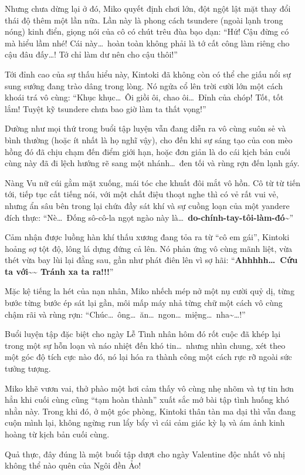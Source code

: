 \documentclass[../main.tex]{subfiles}
\begin{document}
\il

Nhưng chưa dừng lại ở đó, Miko quyết định chơi lớn, đột ngột lật mặt thay đổi thái độ thêm một lần nữa. Lần này là phong cách tsundere (ngoài lạnh trong nóng) kinh điển, giọng nói của cô có chút trêu đùa bạo dạn: ``Hứ! Cậu đừng có mà hiểu lầm nhé! Cái này\dots\ hoàn toàn không phải là tớ cất công làm riêng cho cậu đâu đấy\dots! Tớ chỉ làm dư nên cho cậu thôi!''

Tới đỉnh cao của sự thấu hiểu này, Kintoki đã không còn có thể che giấu nổi sự sung sướng đang trào dâng trong lòng. Nó ngửa cổ lên trời cười lớn một cách khoái trá vô cùng: ``Khục khục\dots\ Ôi giồi ôi, chao ôi\dots\ Đỉnh của chóp! Tốt, tốt lắm! Tuyệt kỹ tsundere chưa bao giờ làm ta thất vọng!''

\il

Dường như mọi thứ trong buổi tập luyện vẫn đang diễn ra vô cùng suôn sẻ và bình thường (hoặc ít nhất là họ nghĩ vậy), cho đến khi sự sáng tạo của con mèo hồng đó đã chịu chạm đến điểm giới hạn, hoặc đơn giản là do cái kịch bản cuối cùng này đã đi lệch hướng rẽ sang một nhánh\dots\ đen tối và rùng rợn đến lạnh gáy.

Nàng Vu nữ cúi gằm mặt xuống, mái tóc che khuất đôi mắt vô hồn. Cô từ từ tiến tới, tiếp tục cất tiếng nói, với một chất điệu thoạt nghe thì có vẻ rất vui vẻ, nhưng ẩn sâu bên trong lại chứa đầy sát khí và sự cuồng loạn của một yandere đích thực: ``Nè\dots\ Đống sô-cô-la ngọt ngào này là\dots\ \textbf{do-chính-tay-tôi-làm-đó}\~{}''


Cảm nhận được luồng hàn khí thấu xương đang tỏa ra từ ``cô em gái'', Kintoki hoảng sợ tột độ, lông lá dựng đứng cả lên. Nó phản ứng vô cùng mãnh liệt, vừa thét vừa bay lùi lại đằng sau, gần như phát điên lên vì sợ hãi: ``\textbf{Ahhhhh\dots\ Cứu ta với\~{}\~{} Tránh xa ta ra!!!}''

Mặc kệ tiếng la hét của nạn nhân, Miko nhếch mép nở một nụ cười quỷ dị, từng bước từng bước ép sát lại gần, môi mấp máy nhả từng chữ một cách vô cùng chậm rãi và rùng rợn: ``Chúc\dots\ ông\dots\ ăn\dots\ ngon\dots\ miệng\dots\ nha\~{}\dots!''

\il

Buổi luyện tập đặc biệt cho ngày Lễ Tình nhân hôm đó rốt cuộc đã khép lại trong một sự hỗn loạn và náo nhiệt đến khó tin\dots\ nhưng nhìn chung, xét theo một góc độ tích cực nào đó, nó lại hóa ra thành công một cách rực rỡ ngoài sức tưởng tượng.

Miko khẽ vươn vai, thở phào một hơi cảm thấy vô cùng nhẹ nhõm và tự tin hơn hẳn khi cuối cùng cũng ``tạm hoàn thành'' xuất sắc mớ bài tập tình huống khó nhằn này. Trong khi đó, ở một góc phòng, Kintoki thân tàn ma dại thì vẫn đang cuộn mình lại, không ngừng run lẩy bẩy vì cái cảm giác kỳ lạ và ám ảnh kinh hoàng từ kịch bản cuối cùng.

Quả thực, đây đúng là một buổi tập dượt cho ngày Valentine độc nhất vô nhị không thể nào quên của Ngôi đền Ảo!
\end{document}
